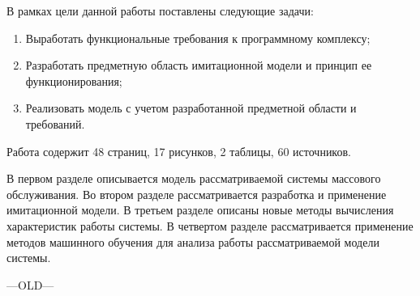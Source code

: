 В рамках цели данной работы поставлены следующие задачи:
\begin{enumerate}
	\item Выработать функциональные требования к программному комплексу;
	\item Разработать предметную область имитационной модели и принцип ее функционирования;
	\item Реализовать модель с учетом разработанной предметной области и требований.
\end{enumerate}

Работа содержит 48 страниц, 17 рисунков, 2 таблицы, 60 источников.

В первом разделе описывается модель рассматриваемой системы массового обслуживания. Во втором разделе рассматривается разработка и применение имитационной модели. В третьем разделе описаны новые методы вычисления характеристик работы системы. В четвертом разделе рассматривается применение методов машинного обучения для анализа работы рассматриваемой модели системы.

---OLD---
 \clearpage
 
